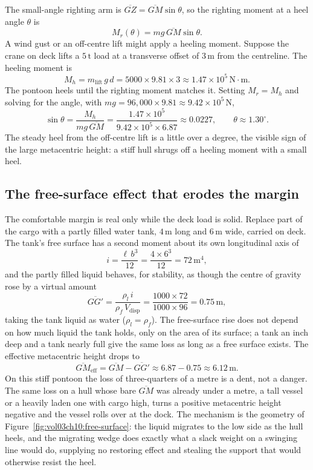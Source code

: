 The small-angle righting arm is $\overline{GZ} = \overline{GM}\sin\theta$,
so the righting moment at a heel angle $\theta$ is
\[
M_r(\theta) = m g\,\overline{GM}\sin\theta.
\]
A wind gust or an off-centre lift might apply a heeling moment. Suppose the
crane on deck lifts a $5\,\si{\tonne}$ load at a transverse offset of
$3\,\si{\meter}$ from the centreline. The heeling moment is
\[
M_h = m_{\text{lift}}\, g\, d
= 5000 \times 9.81 \times 3
\approx 1.47 \times 10^5\,\text{N}\cdot\text{m}.
\]
The pontoon heels until the righting moment matches it. Setting
$M_r = M_h$ and solving for the angle, with $m g = 96{,}000 \times 9.81
\approx 9.42 \times 10^5\,\text{N}$,
\[
\sin\theta = \frac{M_h}{m g\,\overline{GM}}
= \frac{1.47 \times 10^5}{9.42 \times 10^5 \times 6.87}
\approx 0.0227,
\qquad
\theta \approx 1.30^{\circ}.
\]
The steady heel from the off-centre lift is a little over a degree,
the visible sign of the large metacentric height: a stiff hull shrugs off
a heeling moment with a small heel.

\subsection{The free-surface effect that erodes the margin}

The comfortable margin is real only while the deck load is solid. Replace
part of the cargo with a partly filled water tank, $4\,\si{\meter}$ long
and $6\,\si{\meter}$ wide, carried on deck. The tank's free surface has a
second moment about its own longitudinal axis of
\[
i = \frac{\ell\, b^3}{12} = \frac{4 \times 6^3}{12} = 72\,\text{m}^4,
\]
and the partly filled liquid behaves, for stability, as though the centre
of gravity rose by a virtual amount
\[
\overline{GG'} = \frac{\rho_l\, i}{\rho_f\, V_{\text{disp}}}
= \frac{1000 \times 72}{1000 \times 96}
= 0.75\,\si{\meter},
\]
taking the tank liquid as water ($\rho_l = \rho_f$). The free-surface rise
does not depend on how much liquid the tank holds, only on the area of its
surface; a tank an inch deep and a tank nearly full give the same loss as
long as a free surface exists. The effective metacentric height drops to
\[
\overline{GM}_{\text{eff}} = \overline{GM} - \overline{GG'}
\approx 6.87 - 0.75 \approx 6.12\,\si{\meter}.
\]
On this stiff pontoon the loss of three-quarters of a metre is a dent, not
a danger. The same loss on a hull whose bare $\overline{GM}$ was already
under a metre, a tall vessel or a heavily laden one with cargo high,
turns a positive metacentric height negative and the vessel rolls over at
the dock. The mechanism is the geometry of
Figure~\ref{fig:vol03ch10:free-surface}: the liquid migrates to the low
side as the hull heels, and the migrating wedge does exactly what a slack
weight on a swinging line would do, supplying no restoring effect and
stealing the support that would otherwise resist the heel.

